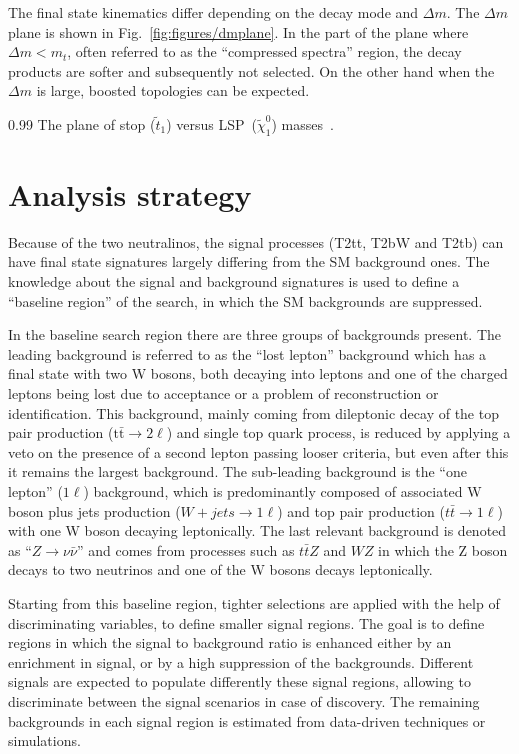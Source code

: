 The final state kinematics differ depending on the decay mode and $\Delta m$. The $\Delta m$ plane is shown in Fig.~\ref{fig:figures/dmplane}. In the part of the plane where $\Delta m < m_t$, often referred to as the ``compressed spectra'' region, the decay products are softer and subsequently not selected. On the other hand when the $\Delta m$ is large, boosted topologies can be expected. 


                 {0.99}       %
                 { The plane of stop ($\tilde{t}_{1}$) versus LSP~($\tilde{\chi}^{0}_{1}$) masses~\cite{Aad:2014kra}. }


\section{Analysis strategy~\label{sec:strategy}}

Because of the two neutralinos, the signal processes (T2tt, T2bW and T2tb)  can have final state signatures largely differing from the SM background ones. The knowledge about the signal and background signatures is used to define a ``baseline region'' of the search, in which the SM backgrounds are suppressed. 

In the baseline search region there are three groups of backgrounds present. The leading background is referred to as the ``lost lepton'' background which has a final state with two W bosons, both decaying into leptons and one of the charged leptons being lost due to acceptance or a problem of reconstruction or identification. This background, mainly coming from dileptonic decay of the top pair production ($\mathrm{t\bar{t}} \to 2 \ell$) and single top quark process,  is reduced by applying a veto on the presence of a second lepton passing looser criteria, but even after this it remains the largest background. The sub-leading background is the ``one lepton'' ($1\ell$) background, which is predominantly composed of associated W boson plus jets production  ($W+jets \to 1\ell$) and top pair production ($t\bar{t} \to 1 \ell$) with one W boson decaying leptonically. The last relevant background is denoted as ``$Z \to \nu \bar{\nu}$'' and comes from processes such as $t\bar{t}Z$ and $WZ$ in which the Z boson decays to two neutrinos and one of the W bosons decays leptonically.  

Starting from this baseline region, tighter selections are applied  with the help of discriminating variables, to define smaller signal regions. The goal is to define regions in which the signal to background ratio is enhanced either by an enrichment in signal, or by a high suppression of the backgrounds. Different signals are expected to populate differently these signal regions, allowing to discriminate between the signal scenarios in case of discovery. The remaining backgrounds in each signal region is estimated from data-driven techniques or simulations. 

